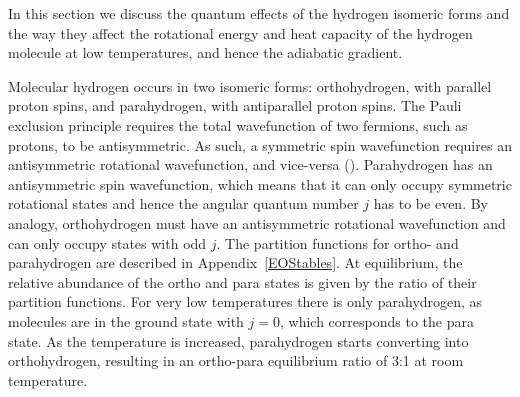 \documentclass[apj]{emulateapj}
\newcommand{\App}[1]{Appendix~\ref{#1}}
\begin{document}
In this section we discuss the quantum effects of the hydrogen isomeric forms and the way they affect the rotational energy and heat capacity of the hydrogen molecule at low temperatures, and hence the adiabatic gradient. 

 Molecular hydrogen occurs in two isomeric forms: orthohydrogen, with parallel proton spins, and parahydrogen, with antiparallel proton spins. The Pauli exclusion principle requires the total wavefunction of two fermions, such as protons, to be antisymmetric. As such, a symmetric spin wavefunction requires an antisymmetric rotational wavefunction, and vice-versa (\citealt{farkas35}). Parahydrogen has an antisymmetric spin wavefunction, which means that it can only occupy symmetric rotational states and hence the angular quantum number $j$ has to be even. By analogy, orthohydrogen must have an antisymmetric rotational wavefunction and can only occupy states with odd $j$. The partition functions for ortho- and parahydrogen are described in \App{EOStables}.
 At equilibrium, the relative abundance of the ortho and para states is given by the ratio of their partition functions. For very low temperatures there is only parahydrogen, as molecules are in the ground state with $j=0$, which corresponds to the para state. As the temperature is increased, parahydrogen starts converting into orthohydrogen, resulting in an ortho-para equilibrium ratio of 3:1 at room temperature.

\end{document}
